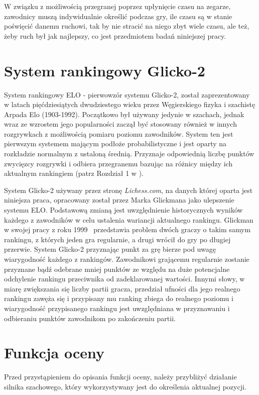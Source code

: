 \documentclass[inzynierska]{pwr_wmat_praca_dyplomowa}
\theoremstyle{plain}
\numberwithin{theorem}{chapter}
\theoremstyle{definition}
\numberwithin{theorem}{chapter}
\begin{document}
W związku z możliwością przegranej poprzez upłynięcie czasu na zegarze, zawodnicy muszą indywidualnie określić podczas gry, ile czasu są w stanie poświęcić danemu ruchowi, tak by nie stracić na niego zbyt wiele czasu, ale też, żeby ruch był jak najlepszy, co jest przedmiotem badań niniejszej pracy.

\section{System rankingowy Glicko-2}
System rankingowy ELO - pierwowzór systemu Glicko-2, został zaprezentowany w latach pięćdziesiątych dwudziestego wieku przez Węgierskiego fizyka i szachistę Arpada Elo (1903-1992). Początkowo był używany jedynie w szachach, jednak wraz ze wzrostem jego popularności zaczął być stosowany również w innych rozgrywkach z możliwością pomiaru poziomu zawodników. System ten jest pierwszym systemem mającym podłoże probabilistyczne i jest oparty na rozkładzie normalnym z ustaloną średnią. Przyznaje odpowiednią liczbę punktów zwycięzcy rozgrywki i odbiera przegranemu bazując na różnicy między ich aktualnym rankingiem (patrz Rozdział 1 w \cite{elo}).


System Glicko-2  używany przez stronę \textit{Lichess.com}, na danych której oparta jest niniejsza praca, opracowany został przez Marka Glickmana jako ulepszenie systemu ELO. Podstawową zmianą jest uwzględnienie historycznych wyników każdego z zawodników w celu ustalenia wariancji aktualnego rankingu. Glickman w swojej pracy z roku 1999~\cite{glicko} przedstawia problem dwóch graczy o takim samym rankingu, z których jeden gra regularnie, a drugi wrócił do gry po długiej przerwie. System Glicko-2 przyznając punkt za grę bierze pod uwagę wiarygodność każdego z rankingów. Zawodnikowi grającemu regularnie zostanie przyznane bądź odebrane mniej punktów ze względu na duże potencjalne odchylenie rankingu przeciwnika od zadeklarowanej wartości. Innymi słowy, w miarę zwiększania się liczby partii gracza, przedział ufności dla jego realnego rankingu zawęża się i przypisany mu ranking zbiega do realnego poziomu i wiarygodność przypisanego rankingu jest uwzględniana w przyznawaniu i odbieraniu punktów zawodnikom po zakończeniu partii.

\section{Funkcja oceny}
Przed przystąpieniem do opisania funkcji oceny, należy przybliżyć działanie silnika szachowego, który wykorzystywany jest do określenia aktualnej pozycji.
\end{document}
